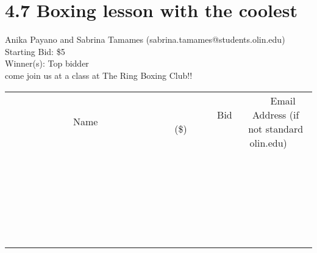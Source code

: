 \documentclass[11pt]{article}
\begin{document}
\section*{4.7 Boxing lesson with the coolest }
Anika Payano and Sabrina Tamames (sabrina.tamames@students.olin.edu) \\
Starting Bid: \$5 \\
Winner(s): 
Top bidder \\
come join us at a class at The Ring Boxing Club!! \\[6ex]
\begin{tabular}{c c c}
~~~~~~~~~~~~~Name~~~~~~~~~~~~~ & ~~~~~~~~~Bid (\$)~~~~~~~~~ & ~~~Email Address (if not standard olin.edu)~~~ \\
 & & \\
\hline
 & & \\
\hline
 & & \\
\hline
 & & \\
\hline
 & & \\
\hline
 & & \\
\hline
 & & \\
\hline
 & & \\
\hline
 & & \\
\hline
 & & \\
\hline
 & & \\
\hline
 & & \\
\hline
 & & \\
\hline
 & & \\
\hline
 & & \\
\hline
 & & \\
\hline
 & & \\
\hline
 & & \\
\hline
 & & \\
\hline
 & & \\
\hline
 & & \\
\hline
 & & \\
\hline
 & & \\
\hline
 & & \\
\hline
 & & \\
\hline
 & & \\
\hline
\end{tabular}
\clearpage
\end{document}

